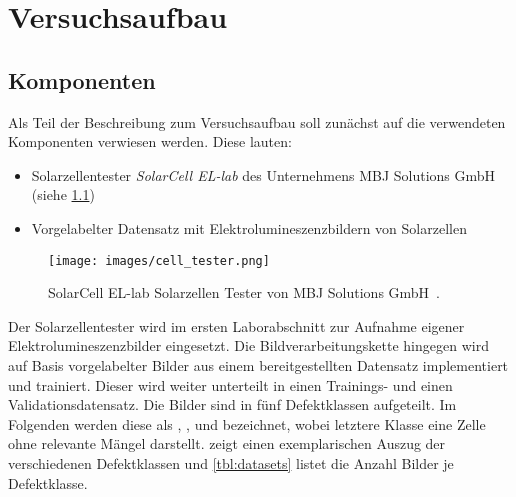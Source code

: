 \chapter{Versuchsaufbau}

\section{Komponenten}

Als Teil der Beschreibung zum Versuchsaufbau soll zunächst auf die verwendeten Komponenten verwiesen werden. Diese lauten:

\begin{itemize}
    \item Solarzellentester \emph{SolarCell EL-lab} des Unternehmens MBJ Solutions GmbH (siehe \cref{fig:cell_tester})
    \item Vorgelabelter Datensatz mit Elektrolumineszenzbildern von Solarzellen
\end{itemize}

\begin{figure}[ht]
    \centering
    \texttt{[image: images/cell\_tester.png]}
    \caption[SolarCell EL-lab Solarzellen Tester von MBJ Solutions GmbH.]{SolarCell EL-lab Solarzellen Tester von MBJ Solutions GmbH~\cite{mbj2022}.\label{fig:cell_tester}}
\end{figure}

Der Solarzellentester wird im ersten Laborabschnitt zur Aufnahme eigener Elektrolumineszenzbilder eingesetzt. Die Bildverarbeitungskette hingegen wird auf Basis vorgelabelter Bilder aus einem bereitgestellten Datensatz implementiert und trainiert. Dieser wird weiter unterteilt in einen Trainings- und einen Validationsdatensatz. Die Bilder sind in fünf Defektklassen aufgeteilt. Im Folgenden werden diese als , ,  und  bezeichnet, wobei letztere Klasse eine Zelle ohne relevante Mängel darstellt.  zeigt einen exemplarischen Auszug der verschiedenen Defektklassen und \cref{tbl:datasets} listet die Anzahl Bilder je Defektklasse.

